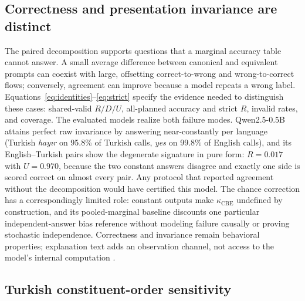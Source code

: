\subsection{Correctness and presentation invariance are distinct}

The paired decomposition supports questions that a marginal accuracy table cannot answer. A small average
difference between canonical and equivalent prompts can coexist with large, offsetting correct-to-wrong and
wrong-to-correct flows; conversely, agreement can improve because a model repeats a wrong label.
Equations~\eqref{eq:identities}--\eqref{eq:strict} specify the evidence needed to distinguish these cases:
shared-valid $R/D/U$, all-planned accuracy and strict $R$, invalid rates, and coverage. The evaluated models
realize both failure modes. Qwen2.5-0.5B attains perfect raw invariance by answering near-constantly per
language (Turkish \emph{hay\i{}r} on 95.8\% of Turkish calls, \emph{yes} on 99.8\% of English calls), and
its English--Turkish pairs show the degenerate signature in pure form: $R = 0.017$ with $U = 0.970$, because
the two constant answers disagree and exactly one side is scored correct on almost every pair. Any protocol
that reported agreement without the decomposition would have certified this model. The chance correction
has a correspondingly limited role: constant outputs make $\kappa_{\mathrm{CBE}}$ undefined by construction,
and its pooled-marginal baseline discounts one particular independent-answer bias reference without
modeling failure causally or proving stochastic independence. Correctness and invariance remain behavioral
properties; explanation text adds an observation channel, not access to the model's internal computation
\citep{turpin2023unfaithful}.

\subsection{Turkish constituent-order sensitivity}

